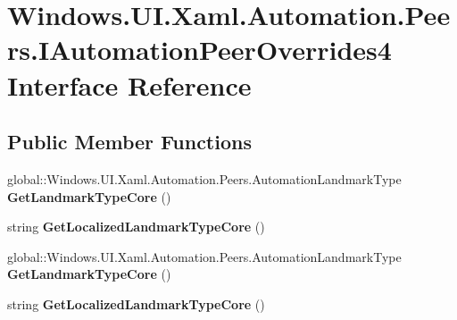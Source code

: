 \hypertarget{interface_windows_1_1_u_i_1_1_xaml_1_1_automation_1_1_peers_1_1_i_automation_peer_overrides4}{}\section{Windows.\+U\+I.\+Xaml.\+Automation.\+Peers.\+I\+Automation\+Peer\+Overrides4 Interface Reference}
\label{interface_windows_1_1_u_i_1_1_xaml_1_1_automation_1_1_peers_1_1_i_automation_peer_overrides4}
\subsection*{Public Member Functions}
\begin{DoxyCompactItemize}
\item 
\mbox{\label{interface_windows_1_1_u_i_1_1_xaml_1_1_automation_1_1_peers_1_1_i_automation_peer_overrides4_ab72b9abc3b22efb936250afa1ae83f6a}} 
global\+::\+Windows.\+U\+I.\+Xaml.\+Automation.\+Peers.\+Automation\+Landmark\+Type {\bfseries Get\+Landmark\+Type\+Core} ()
\item 
\mbox{\label{interface_windows_1_1_u_i_1_1_xaml_1_1_automation_1_1_peers_1_1_i_automation_peer_overrides4_a8c93f185684f9362a33aa40fc5ec098a}} 
string {\bfseries Get\+Localized\+Landmark\+Type\+Core} ()
\item 
\mbox{\label{interface_windows_1_1_u_i_1_1_xaml_1_1_automation_1_1_peers_1_1_i_automation_peer_overrides4_ab72b9abc3b22efb936250afa1ae83f6a}} 
global\+::\+Windows.\+U\+I.\+Xaml.\+Automation.\+Peers.\+Automation\+Landmark\+Type {\bfseries Get\+Landmark\+Type\+Core} ()
\item 
\mbox{\label{interface_windows_1_1_u_i_1_1_xaml_1_1_automation_1_1_peers_1_1_i_automation_peer_overrides4_a8c93f185684f9362a33aa40fc5ec098a}} 
string {\bfseries Get\+Localized\+Landmark\+Type\+Core} ()
\item 

\end{DoxyCompactItemize}
